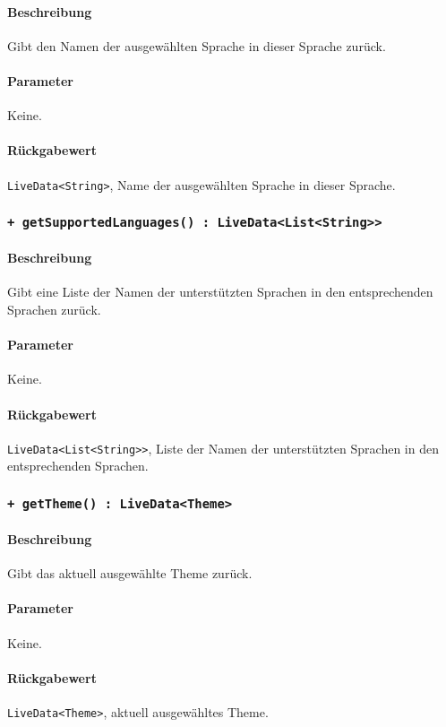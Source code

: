 \paragraph*{Beschreibung}
Gibt den Namen der ausgewählten Sprache in dieser Sprache zurück.
\paragraph*{Parameter}
Keine.
\paragraph*{Rückgabewert}
\texttt{LiveData<String>}, Name der ausgewählten Sprache in dieser Sprache.

\subsubsection*{\texttt{+ getSupportedLanguages() : LiveData<List<String>>}}\label{App_Settings_ISettingsController_getSupportedLanguages}%
\paragraph*{Beschreibung}
Gibt eine Liste der Namen der unterstützten Sprachen in den entsprechenden Sprachen zurück.
\paragraph*{Parameter}
Keine.
\paragraph*{Rückgabewert}
\texttt{LiveData<List<String>>}, Liste der Namen der unterstützten Sprachen in den entsprechenden Sprachen.

\subsubsection*{\texttt{+ getTheme() : LiveData<Theme>}}\label{App_Settings_ISettingsController_getTheme}%
\paragraph*{Beschreibung}
Gibt das aktuell ausgewählte Theme zurück.
\paragraph*{Parameter}
Keine.
\paragraph*{Rückgabewert}
\texttt{LiveData<Theme>}, aktuell ausgewähltes Theme.

